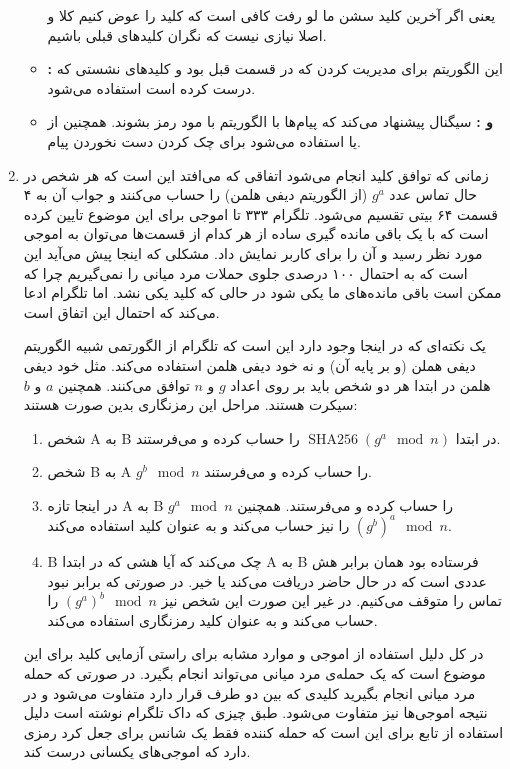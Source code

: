 \documentclass[]{article}
\begin{document}
\begin{enumerate}
\begin{itemize}
        یعنی اگر آخرین کلید سشن ما لو رفت کافی است که کلید را عوض کنیم کلا و اصلا نیازی نیست که نگران کلید‌‌های قبلی باشیم.
        \item \textbf{:} این الگوریتم برای مدیریت کردن  که در قسمت قبل بود و کلید‌های نشستی که
        درست کرده است استفاده می‌شود.
        \item \textbf{ و :} سیگنال پیشنهاد می‌کند که پیام‌ها با الگوریتم
         با مود 
        رمز بشوند. همچنین از
         یا 
        استفاده می‌شود برای چک کردن دست نخوردن پیام.
    \end{itemize}
    \item زمانی که توافق کلید انجام می‌شود اتفاقی که می‌افتد این است که هر شخص در حال تماس
     عدد $g^a$ (از الگوریتم دیفی هلمن)
    را حساب می‌کنند و جواب آن به ۴ قسمت ۶۴ بیتی تقسیم می‌شود. تلگرام ۳۳۳ تا اموجی برای این موضوع تایین کرده است که با 
    یک باقی مانده گیری ساده از هر کدام از قسمت‌ها می‌توان به اموجی مورد نظر رسید و آن را برای کاربر نمایش داد.
    مشکلی که اینجا پیش می‌آید این است که به احتمال ۱۰۰ درصدی جلوی حملات مرد میانی را نمی‌گیریم چرا که ممکن است باقی مانده‌های ما یکی
    شود در حالی که کلید یکی نشد. اما تلگرام ادعا می‌کند که احتمال این اتفاق
    است.

    یک نکته‌ای که در اینجا وجود دارد این است که تلگرام از الگورتمی شبیه الگوریتم دیفی هملن (و بر پایه آن)
    و نه خود دیفی هلمن استفاده می‌کند. مثل خود دیفی هلمن در ابتدا هر دو شخص باید بر روی اعداد
    $g$ و $n$
    توافق می‌کنند. همچنین
    $a$ و $b$
    سیکرت هستند.
    مراحل این رمزنگاری بدین صورت هستند:
    \begin{enumerate}
        \item شخص A به B 
        در ابتدا
        $\operatorname{SHA256}(g^a \mod n)$
        را حساب کرده و می‌فرستند.
        \item شخص B به A
        $g^b \mod n$
        را حساب کرده و می‌فرستند.
        \item در اینجا تازه A به B
        $g^a \mod n$
        را حساب کرده و می‌فرستند.
        همچنین
        $(g^b)^a \mod n$
        را نیز حساب می‌کند و به عنوان کلید استفاده می‌کند.
        \item B
        چک می‌کند که آیا هشی که در ابتدا
        A به B
        فرستاده بود همان برابر هش عددی است که در حال حاضر دریافت می‌کند یا خیر. در صورتی که برابر نبود تماس را متوقف می‌کنیم.
        در غیر این صورت این شخص نیز
        $(g^a)^b \mod n$
        را حساب می‌کند و به عنوان کلید رمزنگاری استفاده می‌کند.
    \end{enumerate}
    در کل دلیل استفاده از اموجی و موارد مشابه برای راستی آزمایی کلید برای این موضوع است که یک حمله‌ی مرد میانی می‌تواند انجام بگیرد.
    در صورتی که حمله مرد میانی انجام بگیرید کلیدی که بین دو طرف قرار دارد متفاوت می‌شود و در نتیجه اموجی‌ها نیز متفاوت می‌شود.
    طبق چیزی که داک تلگرام نوشته است دلیل استفاده از تابع
    برای این است که حمله کننده فقط یک شانس برای جعل کرد رمزی دارد که اموجی‌های یکسانی درست کند.
\end{enumerate}
\end{document}
